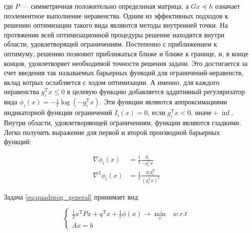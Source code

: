 где $P$ --- симметричная положительно определнная матрица, а $Gx \preceq h$ означает поэлементное выполнение неравенства.
Одним из эффективных подходов к решению оптимизации такого вида являются методы внутренней точки.
На протяжении всей оптимизационной процедуры решение находится внутри области, удовлетворящей ограничениям.
Постепенно с приближением к оптимуму, решению позвояют приближаться ближе и ближе к границе, и, в конце концов, удовлетворяет необходимой точности решения задачи.
Это достигается за счет введения так называемых барьерных функций для ограничений-неравенств, вклад котрых ослабляется с ходом оптимизации.
А именно, для каждого неравенства $g_i^\mathrm{T}x \leq 0$ в целевую функцию добавляется аддитивный регуляризатор вида $\phi_i(x) = -\frac 1 t \log{\left(- g_i^\mathrm{T}x \right)}$.
Эти функции являются аппроксимациями индикаторной функции ограничений $I_i(x) = 0 \text{, если } g_i^\mathrm{T}x < 0 \text{, иначе} +\inf$.
Внутри области, удовлетворяющей ограничениям, функции являются гладкими.
Легко получить выражение для первой и второй производной барьерных функций:

\begin{equation} 
\label{eq:barrier_grads}
\begin{split}
  \nabla \phi_i(x) &= \frac 1 t \frac {g_i}{-g_i^\mathrm{T}x} \\
  \nabla^2 \phi_i(x) &= \frac 1 t \frac {g_i g_i^\mathrm{T}} {\left( g_i^\mathrm{T}x \right)^2}
\end{split}
\end{equation}

Задача \eqref{eq:quadprog_general} принимает вид

\begin{equation}
  \label{eq:quadprog_barrier}
  \begin{cases}
  \frac 1 2 x^\mathrm{T}Px + q^\mathrm{T}x + \frac 1 t \phi(x) \rightarrow \min\limits_x & w.r.t \\
  Ax = b\,
  \end{cases}
\end{equation}

